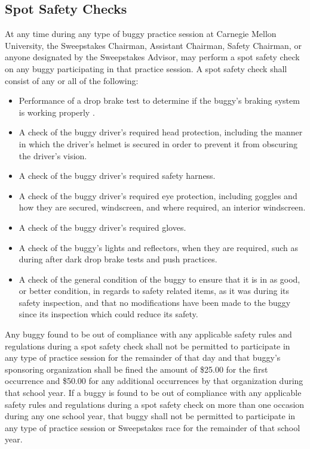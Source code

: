 \subsection{Spot Safety Checks}

	At any time during any type of buggy practice session at Carnegie Mellon
	University, the Sweepstakes Chairman, Assistant Chairman, Safety Chairman, or
	anyone designated by the Sweepstakes Advisor, may perform a spot safety check
	on any buggy participating in that practice session. A spot safety check shall
	consist of any or all of the following:

	\begin{itemize}

		\item Performance of a drop brake test to determine if the buggy's braking
		system is working properly .

		\item A check of the buggy driver's required head protection, including the
		manner in which the driver's helmet is secured in order to prevent it from
		obscuring the driver's vision.

		\item A check of the buggy driver's required safety harness.

		\item A check of the buggy driver's required eye protection, including goggles
		and how they are secured, windscreen, and where required, an interior
		windscreen.

		\item A check of the buggy driver's required gloves.

		\item A check of the buggy's lights and reflectors, when they are required,
		such as during after dark drop brake tests and push practices.

		\item A check of the general condition of the buggy to ensure that it is in as
		good, or better condition, in regards to safety related items, as it was during
		its safety inspection, and that no modifications have been made to the buggy
		since its inspection which could reduce its safety.

	\end{itemize}

	Any buggy found to be out of compliance with any applicable safety rules and
	regulations during a spot safety check shall not be permitted to participate in
	any type of practice session for the remainder of that day and that buggy's
	sponsoring organization shall be fined the amount of \$25.00 for the first
	occurrence and \$50.00 for any additional occurrences by that organization
	during that school year. If a buggy is found to be out of compliance with any
	applicable safety rules and regulations during a spot safety check on more than
	one occasion during any one school year, that buggy shall not be permitted to
	participate in any type of practice session or Sweepstakes race for the
	remainder of that school year.

